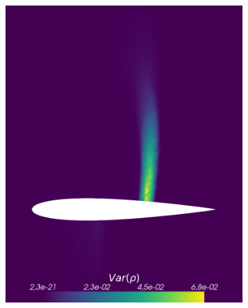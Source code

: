 \begin{figure}[h!]
\begin{subfigure}{0.329\linewidth}
				\includegraphics[width=\linewidth]{figs/Euler1DPlots5/sc100_VarRho.png}
		\label{fig:referenceSolutionsub2}
	\end{subfigure}
	\hfill
	\begin{subfigure}{0.329\linewidth}
		\centering

\end{subfigure}
\end{figure}
